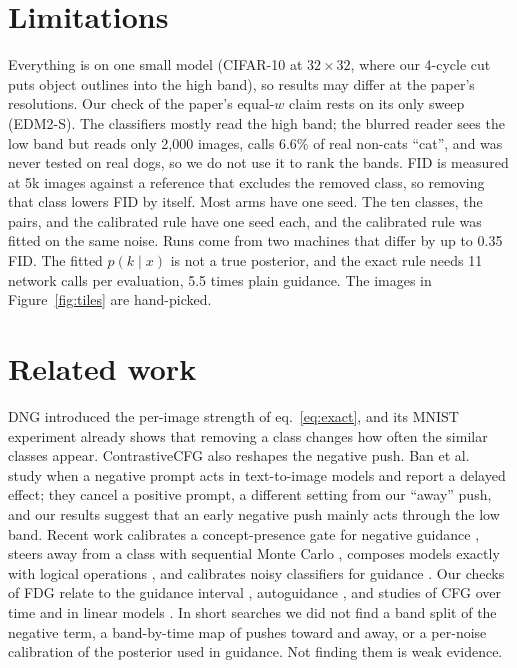 \documentclass[11pt]{article}
\begin{document}
\section{Limitations}
\label{sec:limits}

Everything is on one small model (CIFAR-10 at $32 \times 32$, where our 4-cycle cut puts object outlines into the
high band), so results may differ at the paper's resolutions. Our check of the paper's equal-$w$ claim rests on its only sweep
(EDM2-S). The classifiers mostly read the high band; the blurred reader sees the low band but reads only 2,000 images,
calls 6.6\% of real non-cats ``cat'', and was never tested on real dogs, so we do not use it to rank the bands. FID is
measured at 5k images against a reference that excludes the removed class, so removing that class lowers FID by
itself. Most arms have one seed. The ten classes, the pairs, and the calibrated rule have one seed each, and the
calibrated rule was fitted on the same noise. Runs come from two machines that differ by up to 0.35 FID. The fitted
$p(k\mid x)$ is not a true posterior, and the exact rule needs 11 network calls per evaluation, 5.5 times plain
guidance. The images in Figure~\ref{fig:tiles} are hand-picked.

\section{Related work}
\label{sec:related}

DNG \cite{dng} introduced the per-image strength of eq.~\eqref{eq:exact}, and its MNIST experiment already shows
that removing a class changes how often the similar classes appear. ContrastiveCFG \cite{ccfg} also reshapes the negative push. Ban et al.\ \cite{ban} study
when a negative prompt acts in text-to-image models and report a delayed effect; they cancel a positive prompt, a
different setting from our ``away'' push, and our results suggest that an early negative push mainly acts through the
low band. Recent work calibrates a concept-presence gate for negative guidance \cite{crg}, steers away from a class with
sequential Monte Carlo \cite{smc}, composes models exactly with logical operations \cite{logdiff}, and calibrates noisy
classifiers for guidance \cite{calib}. Our checks of FDG relate to the guidance interval \cite{gi}, autoguidance
\cite{autoguidance}, and studies of CFG over time \cite{stagewise} and in linear models \cite{liwangqu}. In short searches we did not find a band split of the negative term, a band-by-time map of pushes toward
and away, or a per-noise calibration of the posterior used in guidance. Not finding them is weak evidence.
\end{document}

